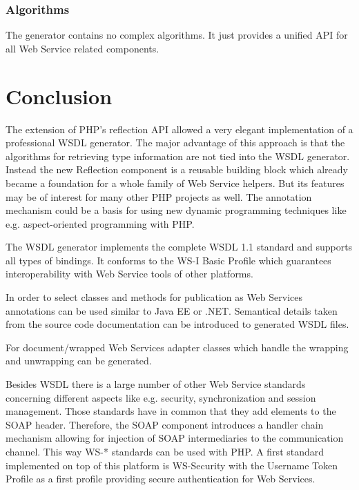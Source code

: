 \documentclass[10pt,final,a4paper,oneside]{article}
\begin{document}

\subsubsection{Algorithms}
The generator contains no complex algorithms.
It just provides a unified API
for all Web Service related components.





\section{Conclusion}
The extension of PHP's reflection API allowed a very elegant 
implementation of a professional WSDL generator. The major advantage of 
this approach is that the algorithms for retrieving type information are 
not tied into the WSDL generator. Instead the new Reflection component is a 
reusable building block which already became a foundation for a whole 
family of Web Service helpers. But its features may be of interest for many
other PHP projects as well. The annotation mechanism could be a basis 
for using new dynamic programming techniques like e.g. aspect-oriented 
programming with PHP. 

The WSDL generator implements the complete WSDL 1.1 standard and 
supports all types of bindings. It conforms to the WS-I Basic Profile 
which guarantees interoperability with Web Service tools of other 
platforms. 

In order to select classes and methods for publication as Web Services 
annotations can be used similar to Java EE or .NET. Semantical details 
taken from the source code documentation can be introduced to generated
WSDL files.

For document/wrapped Web Services adapter classes which handle the 
wrapping and unwrapping can be generated. 

Besides WSDL there is a large number of other Web Service standards concerning 
different aspects like e.g. security, synchronization and session management. 
Those standards have in common that they add elements to the SOAP 
header. Therefore, the SOAP component introduces a handler chain 
mechanism allowing for injection of SOAP intermediaries to the 
communication channel. This way WS-* standards can be used with PHP. A 
first standard implemented on top of this platform is WS-Security with 
the Username Token Profile as a first profile providing secure 
authentication for Web Services. 
\end{document}
